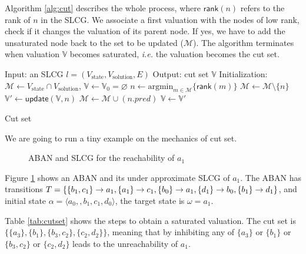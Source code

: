 Algorithm \ref{alg:cut} describes the whole process, where $\mathsf{rank}(n)$ refers to the rank of $n$ in the SLCG.
We associate a first valuation with the nodes of low rank, check if it changes the valuation of its parent node.
If yes, we have to add the unsaturated node back to the set to be updated ($\mathcal{M}$).
The algorithm terminates when valuation $\mathbb{V}$ becomes saturated, \textit{i.e.} the valuation becomes the cut set.

\begin{algorithm}[ht]
\begin{algorithmic}
\State Input: an SLCG $l= (V_{\mathrm{state}},V_{\mathrm{solution}},E)$
\State Output: cut set $\mathbb{V}$
\State Initialization: $\mathcal{M}\gets V_{\mathrm{state}}\cap V_{\mathrm{solution}}$, $\mathbb{V}\gets\mathbb{V}_0=\varnothing$
        \State $n\gets\mathrm{argmin}_{m\in\mathcal{M}}\{\mathsf{rank}(m)\}$
		\State $\mathcal{M}\gets\mathcal{M}\setminus\{n\}$
		\State $\mathbb{V}'\gets\mathsf{update}(\mathbb{V},n)$
		    \State $\mathcal{M}\gets\mathcal{M}\cup(n.pred)$
		\EndIf
		\State $\mathbb{V}\gets\mathbb{V}'$
\EndWhile
\State {} 
\end{algorithmic}
\caption{Cut set}\label{alg:cut}
\end{algorithm}

We are going to run a tiny example on the mechanics of cut set.

\begin{figure}[ht]
\centering

\caption[Example of cut set]{ABAN and SLCG for the reachability of $a_1$}\label{fig:cut}
\end{figure}

\begin{example}\label{example:cutset}
Figure \ref{fig:cut} shows an ABAN and its under approximate SLCG of $a_1$.
The ABAN has transitions $T=\{\{b_1,c_1\}\rightarrow a_1,\{a_1\}\rightarrow c_1,\{b_0\}\rightarrow a_1,\{d_1\}\rightarrow b_0,\{b_1\}\rightarrow d_1\}$, and initial state $\alpha= \langle a_0, ,b_1,c_1,d_0\rangle$, the target state is $\omega=a_1$.


Table \ref{tab:cutset} shows the steps to obtain a saturated valuation.
The cut set is $\{\{a_3\},\{b_1\},\{b_3,c_2\},\{c_2,d_2\}\}$, meaning that by inhibiting any of $\{a_3\}$ or $\{b_1\}$ or $\{b_3,c_2\}$ or $\{c_2,d_2\}$ leads to the unreachability of $a_1$.

\end{example}

